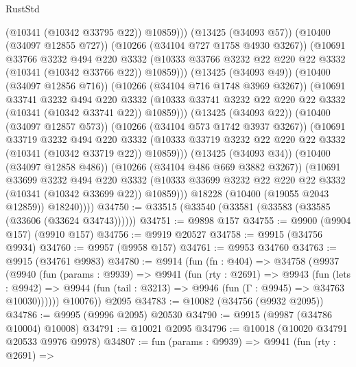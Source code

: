 \begin{lexlean}{RustStd}
\begin{coremodule}
{\begin{coremodule}
{{{{{{{{{{{{{{{{{{{{{{{{{                          (@10341 (@10342 @33795 @22))
                          @10859)))
                    (@13425 (@34093 @57))
                    (@10400 (@34097 @12855 @727))
                    (@10266 (@34104 @727 @1758 @4930 @3267))
                    (@10691
                      @33766
                      @3232
                      @494
                      @220
                      @3332
                      (@10333 @33766 @3232 @22 @220 @22 @3332 (@10341 (@10342 @33766 @22)) @10859)))
                  (@13425 (@34093 @49))
                  (@10400 (@34097 @12856 @716))
                  (@10266 (@34104 @716 @1748 @3969 @3267))
                  (@10691
                    @33741
                    @3232
                    @494
                    @220
                    @3332
                    (@10333 @33741 @3232 @22 @220 @22 @3332 (@10341 (@10342 @33741 @22)) @10859)))
                (@13425 (@34093 @22))
                (@10400 (@34097 @12857 @573))
                (@10266 (@34104 @573 @1742 @3937 @3267))
                (@10691
                  @33719
                  @3232
                  @494
                  @220
                  @3332
                  (@10333 @33719 @3232 @22 @220 @22 @3332 (@10341 (@10342 @33719 @22)) @10859)))
              (@13425 (@34093 @34))
              (@10400 (@34097 @12858 @486))
              (@10266 (@34104 @486 @669 @3882 @3267))
              (@10691
                @33699
                @3232
                @494
                @220
                @3332
                (@10333 @33699 @3232 @22 @220 @22 @3332 (@10341 (@10342 @33699 @22)) @10859)))
            @18228
            (@10400 (@19055 @2043 @12859))
            @18240))))
@34750 := @33515 (@33540 (@33581 (@33583 (@33585 (@33606 (@33624 @34743))))))
@34751 := @9898 @157
@34755 := @9900 (@9904 @157) (@9910 @157)
@34756 := @9919 @20527
@34758 := @9915 (@34756 @9934)
@34760 := @9957 (@9958 @157)
@34761 := @9953 @34760
@34763 := @9915 (@34761 @9983)
@34780 := @9914
    (fun (fn : @404) =>
    @34758
      (@9937
        (@9940
          (fun (params : @9939) =>
          @9941
            (fun (rty : @2691) =>
            @9943
              (fun (lets : @9942) =>
              @9944 (fun (tail : @3213) => @9946 (fun (Γ : @9945) => @34763 @10030))))))
        @10076))
    @2095
@34783 := @10082 (@34756 (@9932 @2095))
@34786 := @9995 (@9996 @2095) @20530
@34790 := @9915 (@9987 (@34786 @10004) @10008)
@34791 := @10021 @2095
@34796 := @10018 (@10020 @34791 @20533 @9976 @9978)
@34807 := fun (params : @9939) =>
  @9941
    (fun (rty : @2691) =>
}}}}}}}}}}}}}}}}}}}}}}}}}
\end{coremodule}}
\end{coremodule}
\end{lexlean}
